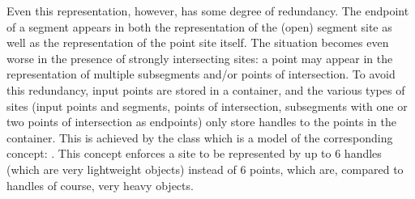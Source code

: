 
Even this representation, however, has some degree of redundancy. The
endpoint of a segment appears in both the representation of the (open)
segment site as well as the representation of the point site
itself. The situation becomes even worse in the presence of strongly
intersecting sites: a 
point may appear in the representation of multiple subsegments and/or
points of intersection. To avoid this redundancy, input points are
stored in a container, and the various types of sites (input points
and segments, points of intersection, subsegments with one or two
points of intersection as endpoints) only store handles to the points
in the container. This is achieved by the
 class which is a
model of the corresponding concept:
. This concept enforces a site
to be represented by up to 6 handles (which are very lightweight
objects) instead of 6 points, which are, compared to handles of
course, very heavy objects.

